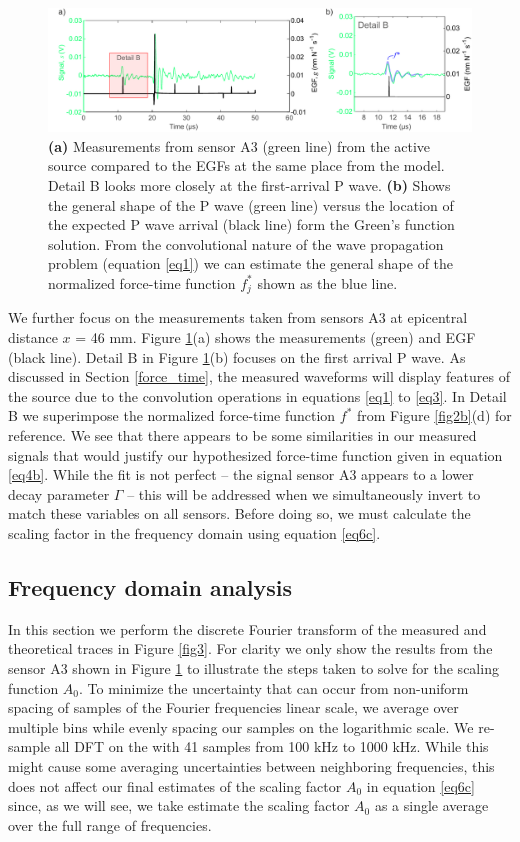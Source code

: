 \documentclass[preprint,3p, 11pt,authoryear]{elsarticle}
\begin{document}
{\begin{figure}[ht]
     	\centering
\includegraphics[scale= 0.85]{FIG5.pdf} 
\caption{\textbf{(a)} Measurements from sensor A3 (green line) from the active source compared to the EGFs at the same place from the model.  Detail B looks more closely at the first-arrival P wave. \textbf{(b)} Shows the general shape of the P wave (green line) versus the location of the expected P wave arrival (black line) form the Green's function solution.  From the convolutional nature of the wave propagation problem (equation \eqref{eq1}) we can estimate the general shape of the normalized force-time function $f^{*}_{j}$ shown as the blue line.}
	\label{fig5} 
\end{figure}

We further focus on the measurements taken from sensors A3 at epicentral distance $x$ = 46 mm. Figure \ref{fig5}(a) shows the measurements (green) and EGF (black line).  Detail B in Figure \ref{fig5}(b) focuses on the first arrival P wave. As discussed in Section \ref{force_time}, the measured waveforms will display features of the source due to the convolution operations in equations \eqref{eq1} to \eqref{eq3}. In Detail B we superimpose the normalized force-time function $f^{*}$ from Figure \ref{fig2b}(d) for reference. We see that there appears to be some similarities in our measured signals that would justify our hypothesized force-time function given in equation \eqref{eq4b}.  While the fit is not perfect -- the signal sensor A3 appears to a lower decay parameter $\Gamma$ -- this will be addressed when we simultaneously invert to match these variables on all sensors. Before doing so, we must calculate the scaling factor in the frequency domain using equation \eqref{eq6c}.

\subsection{Frequency domain analysis}
In this section we perform the discrete Fourier transform of the measured and theoretical traces in Figure \ref{fig3}.  For clarity we only show the results from the sensor A3 shown in Figure \ref{fig5} to illustrate the steps taken to solve for the scaling function $A_{0}$. To minimize the uncertainty that can occur from non-uniform spacing of samples of the Fourier frequencies linear scale, we average over multiple bins while evenly spacing our samples on the logarithmic scale.  We re-sample all DFT on the with 41 samples from 100 kHz to 1000 kHz.  While this might cause some averaging uncertainties between neighboring frequencies, this does not affect our final estimates of the scaling factor  $A_{0}$ in equation \eqref{eq6c} since, as we will see, we take estimate the scaling factor $A_{0}$ as a single average over the full range of frequencies. 

}
\end{document}
